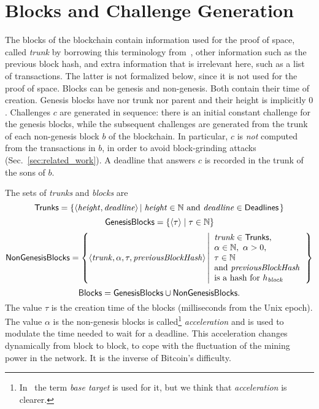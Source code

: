 \section{Blocks and Challenge Generation}\label{sec:challenge_generation}
%
The blocks of the blockchain contain information used for the proof
of space, called \emph{trunk} by borrowing this terminology from~\cite{CohenP19},
other information such as the previous block hash,
and extra information that is irrelevant here, such as a list of transactions.
The latter is not formalized below, since it is not used for the proof of space.
Blocks can be genesis and non-genesis. Both contain their time of creation.
Genesis blocks have nor trunk nor parent and their height is implicitly $0$.
Challenges $c$ are generated in sequence: there is an initial constant challenge for the genesis
blocks, while the subsequent challenges are generated from the trunk of
each non-genesis block $b$ of the blockchain.
In particular, $c$ is \emph{not} computed from the transactions in $b$,
in order to avoid block-grinding attacks (Sec.~\ref{sec:related_work}).
A deadline that answers $c$ is recorded in the trunk of the sons of $b$.
%
\begin{definition}\label{def:trunk}
  The sets of \emph{trunks} and \emph{blocks} are
  \[
  {\mathsf{Trunks}}=\left\{\langle{\mathit{height}},{\mathit{deadline}}\rangle\left|\;{\mathit{height}}\in\mathbb{N}\text{ and }{\mathit{deadline}}\in{\mathsf{Deadlines}}\right.\right\}
  \]
  \[
  {\mathsf{GenesisBlocks}}=\left\{\langle\tau\rangle\mid\tau\in\mathbb{N}\right\}
  \]
  \[
  {\mathsf{NonGenesisBlocks}}=\left\{\langle{\mathit{trunk}},\alpha,\tau,{\mathit{previousBlockHash}}\rangle\left|\begin{array}{l}
  {\mathit{trunk}}\in{\mathsf{Trunks}},\\
  \alpha\in\mathbb{N},\ \alpha>0,\\
  \tau\in\mathbb{N}\\
  \text{and }{\mathit{previousBlockHash}}\\
  \text{is a hash for $h_{\mathit{block}}$}
  \end{array}\right.\right\}
  \]
  \[
  {\mathsf{Blocks}}={\mathsf{GenesisBlocks}}\cup{\mathsf{NonGenesisBlocks}}.
  \]
  The value $\tau$ is the creation time of the blocks (milliseconds from the Unix epoch).
  The value $\alpha$ is the non-genesis blocks
  is called\footnote{In~\cite{SignumPlotting} the term
  \emph{base target} is used for it, but we think that \emph{acceleration} is clearer.}
  \emph{acceleration} and is used to modulate the time needed to wait for a deadline.
  This acceleration changes dynamically from block to block, to cope with
  the fluctuation of the mining power in the network. It is the inverse of Bitcoin's difficulty.
\end{definition}
